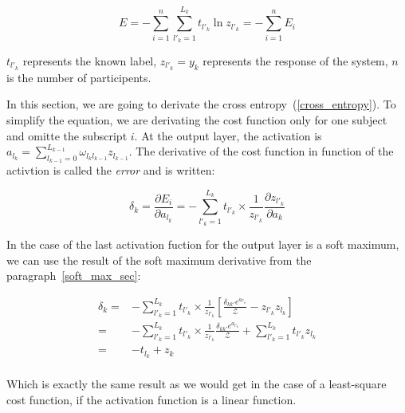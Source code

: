 \documentclass[final, paper=letter,5p,times,twocolumn]{elsarticle}
\begin{document}
\begin{equation}
  E = - \sum_{i = 1}^{n}\sum_{l'_{k} = 1}^{L_{k}} t_{l'_{k}} \ln z_{l'_{k}} =  - \sum_{i = 1}^{n} E_{i}
  \label{cross_entropy}
\end{equation}

$t_{l'_{k}}$ represents the known label, $z_{l'_{k}} = y_{k}$ represents the response of the system, $n$ is the number of participents. 

In this section, we are going to derivate the cross entropy~(\ref{cross_entropy}). To simplify the equation, we are derivating the cost function only for one subject and omitte the subscript $i$. At the output layer, the activation is $a_{l_{k}} = \sum_{l_{k-1} = 0}^{L_{k-1}} \omega_{l_{k}l_{k-1}} z_{l_{k-1}}$. The derivative of the cost function in function of the activtion is called the {\it error} and is written:

\begin{equation}
  \delta_{k} = \frac{\partial E_{i}}{\partial a_{l_{k}}} = - \sum_{l'_{k} = 1}^{L_{k}} t_{l'_{k}} \times \frac{1}{z_{l'_{k}}} \frac{\partial z_{l'_{k}}}{\partial a_{k}}
  \label{cost_function_error}
\end{equation}

In the case of the last activation fuction for the output layer is a soft maximum, we can use the result of the soft maximum derivative from the paragraph~\ref{soft_max_sec}:

\begin{equation*}
  \begin{split}
    \delta_{k} = & - \sum_{l'_{k} = 1}^{L_{k}} t_{l'_{k}} \times \frac{1}{z_{l'_{k}}} \left \lbrack  \frac{\delta_{kk'} e^{a_{l'_{k}}}}{\mathcal{Z}} - z_{l'_{k}}z_{l_{k}} \right \rbrack \\
    = & - \sum_{l'_{k} = 1}^{L_{k}} t_{l'_{k}} \times \frac{1}{z_{l'_{k}}} \frac{\delta_{kk'} e^{a_{l'_{k}}}}{\mathcal{Z}} +  \sum_{l'_{k} = 1}^{L_{k}} t_{l'_{k}} z_{l_{k}} \\
    = & - t_{l_{k}} +  z_{k} \\
  \end{split}
\end{equation*}



Which is exactly the same result as we would get in the case of a least-square cost function, if the activation function is a linear function. 


\end{document}
